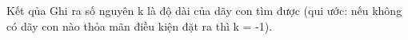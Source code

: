 Kết qủa
Ghi ra số nguyên k là độ dài của dãy con tìm được (qui ước: nếu không có dãy con nào thỏa mãn điều kiện đặt ra thì k = -1).